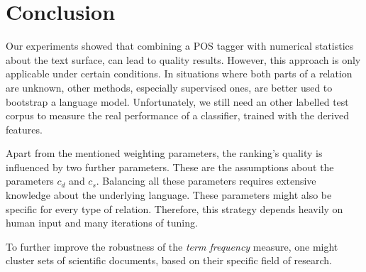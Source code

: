 \documentclass[runningheads]{llncs}
\begin{document}
\section{Conclusion}
Our experiments showed that combining a POS tagger with numerical statistics about the text surface, can lead to quality results. However, this approach is only applicable under certain conditions. In situations where both parts of a relation are unknown, other methods, especially supervised ones, are better used to bootstrap a language model. Unfortunately, we still need an other labelled test corpus to measure the real performance of a classifier, trained with the derived features.

Apart from the mentioned weighting parameters, the ranking's quality is influenced by two further parameters. These are the assumptions about the parameters $c_{d}$ and $c_{s}$. Balancing all these parameters requires extensive knowledge about the underlying language. These parameters might also be specific for every type of relation. Therefore, this strategy depends heavily on human input and many iterations of tuning.

To further improve the robustness of the \emph{term frequency} measure, one might cluster sets of scientific documents, based on their specific field of research.




\end{document}
